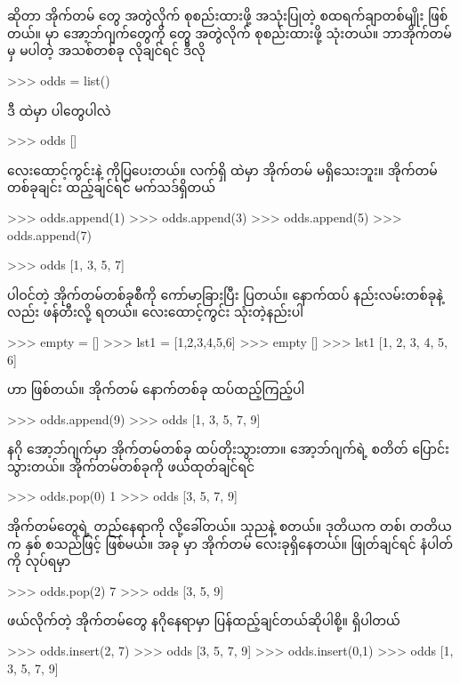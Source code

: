 \section{}
 ဆိုတာ အိုက်တမ်  တွေ အတွဲလိုက် စုစည်းထားဖို့ အသုံးပြုတဲ့ စထရက်ချာတစ်မျိုး ဖြစ်တယ်။  မှာ  အော့ဘ်ဂျက်တွေကို   တွေ အတွဲလိုက် စုစည်းထားဖို့ သုံးတယ်။ ဘာအိုက်တမ်မှ မပါတဲ့  အသစ်တစ်ခု လိုချင်ရင် ဒီလို
\begin{codetxt}
>>> odds = list()
\end{codetxt}
ဒီ  ထဲမှာ ပါတွေပါလဲ 
\begin{codetxt}
>>> odds
[]
\end{codetxt}
လေးထောင့်ကွင်းနဲ့  ကိုပြပေးတယ်။ လက်ရှိ  ထဲမှာ အိုက်တမ် မရှိသေးဘူး။ အိုက်တမ် တစ်ခုချင်း ထည့်ချင်ရင်  မက်သဒ်ရှိတယ်
\begin{codetxt}
>>> odds.append(1)
>>> odds.append(3)
>>> odds.append(5)
>>> odds.append(7)
\end{codetxt}
\betweenminted{\medskipamount}
\begin{codetxt}
>>> odds
[1, 3, 5, 7]
\end{codetxt}
ပါဝင်တဲ့ အိုက်တမ်တစ်ခုစီကို ကော်မာခြားပြီး ပြတယ်။ နောက်ထပ် နည်းလမ်းတစ်ခုနဲ့လည်း  ဖန်တီးလို့ ရတယ်။ လေးထောင့်ကွင်း သုံးတဲ့နည်းပါ
\begin{codetxt}
>>> empty = []
>>> lst1 = [1,2,3,4,5,6]
>>> empty
[]
>>> lst1
[1, 2, 3, 4, 5, 6]
\end{codetxt}

 ဟာ  ဖြစ်တယ်။ အိုက်တမ် နောက်တစ်ခု ထပ်ထည့်ကြည့်ပါ
\begin{codetxt}
>>> odds.append(9)
>>> odds
[1, 3, 5, 7, 9]
\end{codetxt}
နဂို အော့ဘ်ဂျက်မှာ အိုက်တမ်တစ်ခု ထပ်တိုးသွားတာ။ အော့ဘ်ဂျက်ရဲ့ စတိတ် ပြောင်းသွားတယ်။ အိုက်တမ်တစ်ခုကို ဖယ်ထုတ်ချင်ရင် 
\begin{codetxt}
>>> odds.pop(0)
1
>>> odds
[3, 5, 7, 9]    
\end{codetxt}
 အိုက်တမ်တွေရဲ့ တည်နေရာကို  လို့ခေါ်တယ်။ သုညနဲ့ စတယ်။ ဒုတိယက တစ်၊ တတိယက နှစ် စသည်ဖြင့် ဖြစ်မယ်။ အခု  မှာ အိုက်တမ် လေးခုရှိနေတယ်။  ဖြုတ်ချင်ရင်  နံပါတ်  ကို  လုပ်ရမှာ
\begin{codetxt}
>>> odds.pop(2)
7
>>> odds
[3, 5, 9]
\end{codetxt}
ဖယ်လိုက်တဲ့ အိုက်တမ်တွေ နဂိုနေရာမှာ ပြန်ထည့်ချင်တယ်ဆိုပါစို့။  ရှိပါတယ်
\begin{codetxt}
>>> odds.insert(2, 7)
>>> odds
[3, 5, 7, 9]
>>> odds.insert(0,1)
>>> odds
[1, 3, 5, 7, 9]
\end{codetxt}

